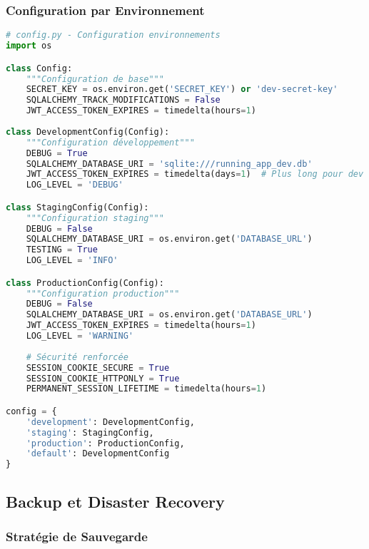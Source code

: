 \subsubsection{Configuration par Environnement}

\begin{lstlisting}[language=python]
# config.py - Configuration environnements
import os

class Config:
    """Configuration de base"""
    SECRET_KEY = os.environ.get('SECRET_KEY') or 'dev-secret-key'
    SQLALCHEMY_TRACK_MODIFICATIONS = False
    JWT_ACCESS_TOKEN_EXPIRES = timedelta(hours=1)
    
class DevelopmentConfig(Config):
    """Configuration développement"""
    DEBUG = True
    SQLALCHEMY_DATABASE_URI = 'sqlite:///running_app_dev.db'
    JWT_ACCESS_TOKEN_EXPIRES = timedelta(days=1)  # Plus long pour dev
    LOG_LEVEL = 'DEBUG'

class StagingConfig(Config):
    """Configuration staging"""
    DEBUG = False
    SQLALCHEMY_DATABASE_URI = os.environ.get('DATABASE_URL')
    TESTING = True
    LOG_LEVEL = 'INFO'

class ProductionConfig(Config):
    """Configuration production"""
    DEBUG = False
    SQLALCHEMY_DATABASE_URI = os.environ.get('DATABASE_URL')
    JWT_ACCESS_TOKEN_EXPIRES = timedelta(hours=1)
    LOG_LEVEL = 'WARNING'
    
    # Sécurité renforcée
    SESSION_COOKIE_SECURE = True
    SESSION_COOKIE_HTTPONLY = True
    PERMANENT_SESSION_LIFETIME = timedelta(hours=1)

config = {
    'development': DevelopmentConfig,
    'staging': StagingConfig,
    'production': ProductionConfig,
    'default': DevelopmentConfig
}
\end{lstlisting}

\subsection{Backup et Disaster Recovery}

\subsubsection{Stratégie de Sauvegarde}

